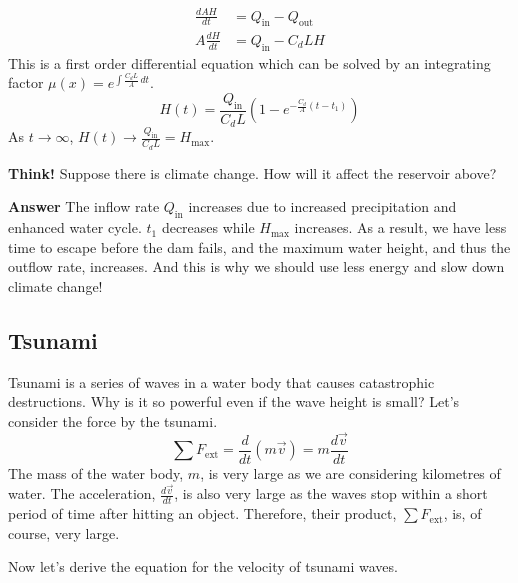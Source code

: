 \documentclass[twoside]{article}
\newcommand{\question}[1]{\begin{questionbox} \emoji{grapes} \textbf{Think!} \newline #1 \end{questionbox}}
\newcommand{\answer}[1]{\begin{answerbox} \emoji{melon} \textbf{Answer} \newline #1 \end{answerbox}}
\numberwithin{equation}{section}
\begin{document}
{\begin{minipage}[c]{\textwidth-5.5cm}
			\begin{align*}
				\frac{dAH}{dt} &= Q_{\text{in}}-Q_{\text{out}} \\
				A \frac{dH}{dt} &= Q_{\text{in}}-C_d LH
			\end{align*}
			This is a first order differential equation which can be solved by an integrating factor $\mu(x) = e^{\int \frac{C_d L}{A} \, dt}$.
			\begin{equation*}
				H(t) = \frac{Q_{\text{in}}}{C_d L} \left( 1-e^{-\frac{C_d}{A} (t-t_1)} \right)
			\end{equation*}
			As $t \to \infty$, $H(t) \to \frac{Q_{\text{in}}}{C_d L} = H_{\text{max}}$.
		\end{minipage}
	}
	
	\newpage
	
	\question{Suppose there is climate change. How will it affect the reservoir above?}
	
	\answer{The inflow rate $Q_{\text{in}}$ increases due to increased precipitation and enhanced water cycle. $t_1$ decreases while $H_{\text{max}}$ increases. As a result, we have less time to escape before the dam fails, and the maximum water height, and thus the outflow rate, increases. And this is why we should use less energy and slow down climate change!}
	
	\subsection{Tsunami}
	\label{subsec:Tsunami}
	
	Tsunami is a series of waves in a water body that causes catastrophic destructions. Why is it so powerful even if the wave height is small? Let's consider the force by the tsunami.
	\begin{equation*}
		\sum F_{\text{ext}} = \frac{d}{dt} (m \vec{v}) = m \frac{d \vec{v}}{dt}
	\end{equation*}
	The mass of the water body, $m$, is very large as we are considering kilometres of water. The acceleration, $\frac{d \vec{v}}{dt}$, is also very large as the waves stop within a short period of time after hitting an object. Therefore, their product, $\sum F_{\text{ext}}$, is, of course, very large.
	
	Now let's derive the equation for the velocity of tsunami waves.
	
\end{document}
